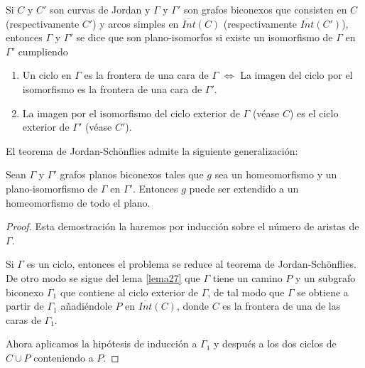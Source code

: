 \begin{definition}
	Si $C$ y $C'$ son curvas de Jordan y $\Gamma$ y $\Gamma'$ son grafos biconexos que consisten en $C$ (respectivamente $C'$) y arcos   simples en $\overline{Int}(C)$ (respectivamente $\overline{Int}(C')$), entonces $\Gamma$ y $\Gamma'$ se dice que son plano-isomorfos si existe un isomorfismo de $\Gamma$ en $\Gamma'$ cumpliendo 
\begin{enumerate}
	\item Un ciclo en $\Gamma$ es la frontera de una cara de $\Gamma$     $\iff$ La imagen del ciclo por el isomorfismo es la frontera de una cara de $\Gamma'$.
	\item La imagen por el isomorfismo del ciclo exterior de $\Gamma$ (véase $C$) es el ciclo exterior de $\Gamma'$ (véase $C'$).
\end{enumerate}	
\end{definition}
El teorema de Jordan-Schönflies admite la siguiente generalización:
\begin{theorem}\label{teorema33}
	Sean $\Gamma$ y $\Gamma'$ grafos planos biconexos tales que $g$ sea un homeomorfismo y un plano-isomorfismo de $\Gamma$ en $\Gamma'$. Entonces $g$ puede ser extendido a un homeomorfismo de todo el plano.
\end{theorem}

\begin{proof}
	Esta demostración la haremos por inducción sobre el número de aristas de $\Gamma$.

	Si $\Gamma$ es un ciclo, entonces el problema se reduce al teorema de Jordan-Schönflies. De otro modo se sigue del lema \ref{lema27} que $\Gamma$ tiene un camino $P$ y un subgrafo biconexo $\Gamma_1$ que contiene al ciclo exterior de $\Gamma$, de tal modo que $\Gamma$ se obtiene a partir de $\Gamma_1$ añadiéndole $P$ en $\overline{Int}(C)$, donde $C$ es la frontera de una de las caras de $\Gamma_1$.

	Ahora aplicamos la hipótesis de inducción a $\Gamma_1$ y después a los dos ciclos de $C \cup P$ conteniendo a $P$.
\end{proof}
